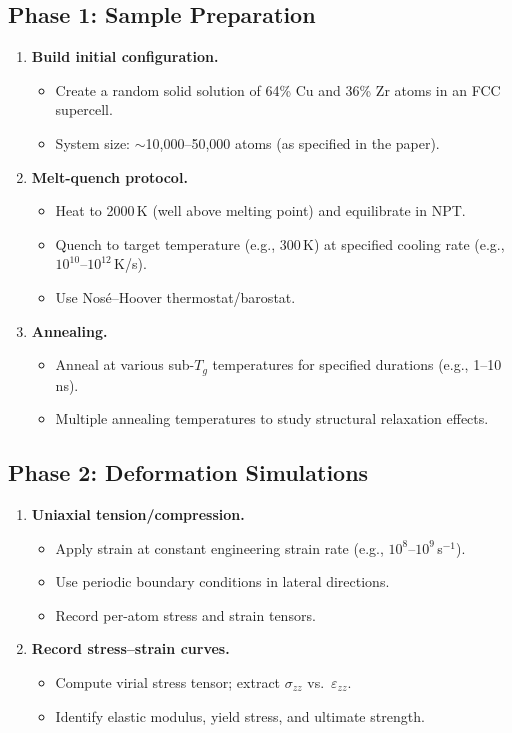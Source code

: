 \documentclass[11pt,a4paper]{article}
\begin{document}
\subsection{Phase 1: Sample Preparation}
\begin{enumerate}[label=\textbf{1.\arabic*}]
  \item \textbf{Build initial configuration.}
    \begin{itemize}
      \item Create a random solid solution of 64\% Cu and 36\% Zr atoms in an FCC supercell.
      \item System size: $\sim$10,000--50,000 atoms (as specified in the paper).
    \end{itemize}
  \item \textbf{Melt-quench protocol.}
    \begin{itemize}
      \item Heat to 2000\,K (well above melting point) and equilibrate in NPT.
      \item Quench to target temperature (e.g., 300\,K) at specified cooling rate (e.g., $10^{10}$--$10^{12}$\,K/s).
      \item Use Nos\'{e}--Hoover thermostat/barostat.
    \end{itemize}
  \item \textbf{Annealing.}
    \begin{itemize}
      \item Anneal at various sub-$T_g$ temperatures for specified durations (e.g., 1--10\,ns).
      \item Multiple annealing temperatures to study structural relaxation effects.
    \end{itemize}
\end{enumerate}

\subsection{Phase 2: Deformation Simulations}
\begin{enumerate}[label=\textbf{2.\arabic*}]
  \item \textbf{Uniaxial tension/compression.}
    \begin{itemize}
      \item Apply strain at constant engineering strain rate (e.g., $10^8$--$10^9$\,s$^{-1}$).
      \item Use periodic boundary conditions in lateral directions.
      \item Record per-atom stress and strain tensors.
    \end{itemize}
  \item \textbf{Record stress--strain curves.}
    \begin{itemize}
      \item Compute virial stress tensor; extract $\sigma_{zz}$ vs.\ $\varepsilon_{zz}$.
      \item Identify elastic modulus, yield stress, and ultimate strength.
    \end{itemize}
\end{enumerate}
\end{document}
